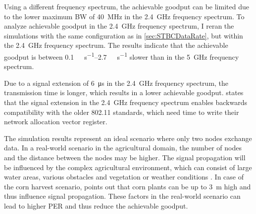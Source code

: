 Using a different frequency spectrum, the achievable goodput can be limited due to the lower maximum \ac{BW} of \SI{40}{\mega\hertz} in the \SI{2.4}{\giga\hertz} frequency spectrum.
To analyze achievable goodput in the \SI{2.4}{\giga\hertz} frequency spectrum, I reran the simulations with the same configuration as in \autoref{sec:STBCDataRate}, but within the \SI{2.4}{\giga\hertz} frequency spectrum.
The results indicate that the achievable goodput is between \SIrange{0.1}{2.7}{\mega\bit\per\second} slower than in the \SI{5}{\giga\hertz} frequency spectrum.

Due to a signal extension of \SI{6}{\micro\second} in the \SI{2.4}{\giga\hertz} frequency spectrum, the transmission time is longer, which results in a lower achievable goodput.
\cite{ieee_standard_2009n} states that the signal extension in the \SI{2.4}{\giga\hertz} frequency spectrum enables
backwards compatibility with the older 802.11 standards, which need time to write their network allocation vector register.

The simulation results represent an ideal scenario where only two nodes exchange data.
In a real-world scenario in the agricultural domain, the number of nodes and the distance between the nodes may be higher.
The signal propagation will be influenced by the complex agricultural environment,
which can consist of large water areas, various obstacles and vegetation or weather conditions \cite{brinkhoff_characterization_2017}.
In case of the corn harvest scenario, \textcite{smolnik_5g_2020} points out that corn plants can be up to \SI{3}{\metre} high
and thus influence signal propagation.
These factors in the real-world scenario can lead to higher \ac{PER} and thus reduce the achievable goodput.

